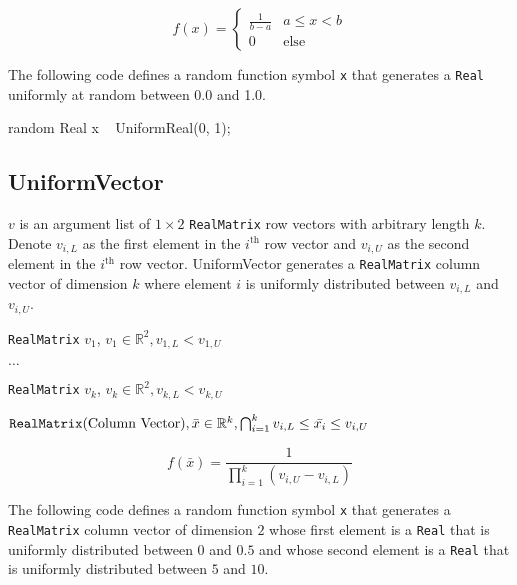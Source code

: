 \[
	f(x) = \left\{
		  \begin{array}{lr}
		    \frac{1}{b - a} & a \leq x < b \\
		    0 					& \text{else}
		  \end{array}
		\right.
\]

The following code defines a random function symbol \verb|x| that generates a \verb|Real| uniformly at random between 0.0 and 1.0.

\begin{blogcode}
random Real x ~ UniformReal(0, 1);
\end{blogcode}

\subsection{UniformVector}

$v$ is an argument list of $1 \times 2$ \verb|RealMatrix| row vectors with arbitrary length $k$. Denote $v_{i,L}$ as the first element in the $i^{\text{th}}$ row vector and $v_{i, U}$ as the second element in the $i^{\text{th}}$ row vector. UniformVector generates a \verb|RealMatrix| column vector of dimension $k$ where element $i$ is uniformly distributed between $v_{i,L}$ and $v_{i,U}$.

\begin{itemize*}
\item[] \verb|RealMatrix| $v_{1}$, $v_{1} \in \mathbb{R}^{2}, v_{1,L} < v_{1,U}$
\item[] $\ldots$
\item[] \verb|RealMatrix| $v_{k}$, $v_{k} \in \mathbb{R}^{2}, 
v_{k,L} < v_{k,U}$

\end{itemize*}

\begin{itemize*}
\item[] $\verb|RealMatrix| \text{(Column Vector)}, 
\bar{x} \in \mathbb{R}^{k}, \bigcap_{i=1}^{k} v_{i,L} \leq \bar{x_{i}} \leq v_{i,U}  $
\end{itemize*}

\[
	f(\bar{x}) = \frac{1}{\prod_{i=1}^{k} (v_{i,U} - v_{i,L})}
\]

The following code defines a random function symbol \verb|x| that generates a \verb|RealMatrix| column vector of dimension $2$ whose first element is a \verb|Real| that is uniformly distributed between $0$ and $0.5$ and whose second element is a \verb|Real| that is uniformly distributed between $5$ and $10$.

